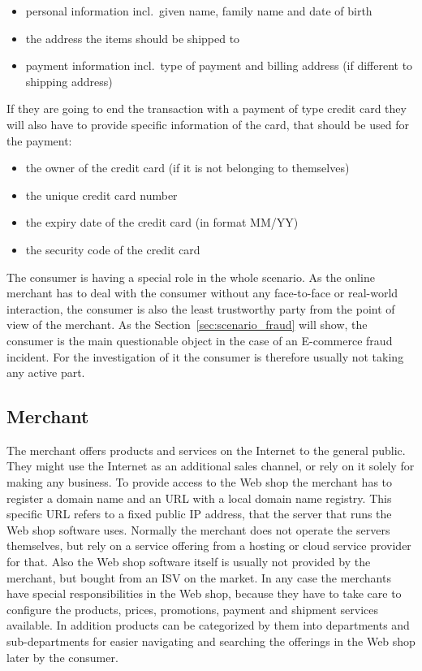 \begin{itemize}
		\item personal information incl.\ given name, family name and date of birth
		\item the address the items should be shipped to
		\item payment information incl.\ type of payment and billing address (if different to shipping address)
\end{itemize}

If they are going to end the transaction with a payment of type credit card they will also have to provide specific information of the card, that should be used for the payment:\@

\begin{itemize}
		\item the owner of the credit card (if it is not belonging to themselves)
		\item the unique credit card number
		\item the expiry date of the credit card (in format MM/YY)
		\item the security code of the credit card
\end{itemize}

The consumer is having a special role in the whole scenario. As the online merchant has to deal with the consumer without any face-to-face or real-world interaction, the consumer is also the least trustworthy party from the point of view of the merchant. As the Section~\ref{sec:scenario_fraud} will show, the consumer is the main questionable object in the case of an \gls{E-commerce} fraud incident. For the investigation of it the consumer is therefore usually not taking any active part.


\subsection{Merchant}
\label{subsec:stakeholder_merchant}

The merchant offers products and services on the Internet to the general public. They might use the Internet as an additional sales channel, or rely on it solely for making any business. To provide access to the Web shop the merchant has to register a domain name and an \gls{URL} with a local domain name registry. This specific \gls{URL} refers to a fixed public \gls{IP} address, that the server that runs the Web shop software uses. Normally the merchant does not operate the servers themselves, but rely on a service offering from a hosting or cloud service provider for that. Also the Web shop software itself is usually not provided by the merchant, but bought from an \gls{ISV} on the market. In any case the merchants have special responsibilities in the Web shop, because they have to take care to configure the products, prices, promotions, payment and shipment services available. In addition products can be categorized by them into departments and sub-departments for easier navigating and searching the offerings in the Web shop later by the consumer. \\

